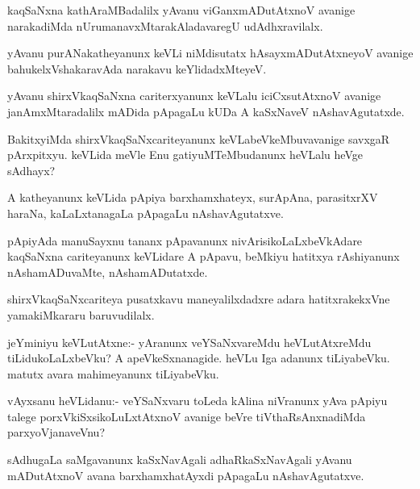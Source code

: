 \begin{mng}
kaqSaNxna kathAraMBadalilx yAvanu viGanxmADutAtxnoV avanige narakadiMda nUrumanavxMtarakAladavaregU udAdhxravilalx.
\end{mng}

\begin{mng}
yAvanu purANakatheyanunx keVLi niMdisutatx hAsayxmADutAtxneyoV avanige bahukelxVshakaravAda narakavu keYlidadxMteyeV.
\end{mng}

\begin{mng}
yAvanu shirxVkaqSaNxna cariterxyanunx keVLalu iciCxsutAtxnoV avanige janAmxMtaradalilx mADida pApagaLu kUDa A kaSxNaveV nAshavAgutatxde.
\end{mng}

\begin{mng}
BakitxyiMda shirxVkaqSaNxcariteyanunx keVLabeVkeMbuvavanige savxgaR pArxpitxyu. keVLida meVle Enu gatiyuMTeMbudanunx heVLalu heVge sAdhayx?
\end{mng}

\begin{mng}
A katheyanunx keVLida pApiya barxhamxhateyx, surApAna, parasitxrXV haraNa, kaLaLxtanagaLa pApagaLu nAshavAgutatxve.
\end{mng}

\begin{mng}
pApiyAda manuSayxnu tananx pApavanunx nivArisikoLaLxbeVkAdare kaqSaNxna cariteyanunx keVLidare A pApavu, beMkiyu hatitxya rAshiyanunx nAshamADuvaMte, nAshamADutatxde.
\end{mng}

\begin{mng}
shirxVkaqSaNxcariteya pusatxkavu maneyalilxdadxre adara hatitxrakekxVne yamakiMkararu baruvudilalx.
\end{mng}

\begin{mng}
jeYminiyu keVLutAtxne:- yAranunx veYSaNxvareMdu heVLutAtxreMdu tiLidukoLaLxbeVku? A apeVkeSxnanagide. heVLu Iga adanunx tiLiyabeVku. matutx avara mahimeyanunx tiLiyabeVku.
\end{mng}

\begin{mng}
vAyxsanu heVLidanu:- veYSaNxvaru toLeda kAlina niVranunx yAva pApiyu talege porxVkiSxsikoLuLxtAtxnoV avanige beVre tiVthaRsAnxnadiMda parxyoVjanaveVnu?
\end{mng}

\begin{mng}
sAdhugaLa saMgavanunx kaSxNavAgali adhaRkaSxNavAgali yAvanu mADutAtxnoV avana barxhamxhatAyxdi pApagaLu nAshavAgutatxve.
\end{mng}

